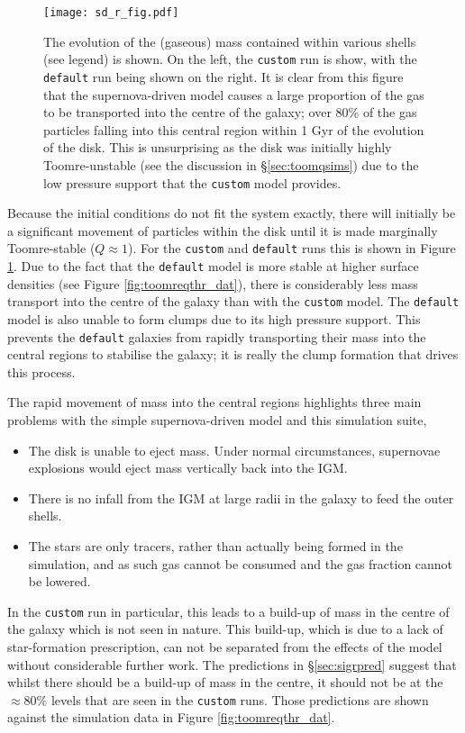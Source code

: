 \begin{figure}[!ht]
    \centering
    \texttt{[image: sd\_r\_fig.pdf]}
    \caption{The evolution of the (gaseous) mass contained within various shells (see legend) is shown. On the left, the {\tt custom} run is show, with the {\tt default} run being shown on the right. It is clear from this figure that the supernova-driven model causes a large proportion of the gas to be transported into the centre of the galaxy; over 80\% of the gas particles falling into this central region within 1 Gyr of the evolution of the disk. This is unsurprising as the disk was initially highly Toomre-unstable (see the discussion in \S \ref{sec:toomqsims}) due to the low pressure support that the {\tt custom} model provides.}
    \label{fig:sd_r_evo}
\end{figure}
Because the initial conditions do not fit the system exactly, there will initially be a significant movement of particles within the disk until it is made marginally Toomre-stable ($Q\approx1$).
For the {\tt custom} and {\tt default} runs this is shown in Figure \ref{fig:sd_r_evo}.
Due to the fact that the {\tt default} model is more stable at higher surface densities (see Figure \ref{fig:toomreqthr_dat}), there is considerably less mass transport into the centre of the galaxy than with the {\tt custom} model.
The {\tt default} model is also unable to form clumps due to its high pressure support.
This prevents the {\tt default} galaxies from rapidly transporting their mass into the central regions to stabilise the galaxy; it is really the clump formation that drives this process. 

The rapid movement of mass into the central regions highlights three main problems with the simple supernova-driven model and this simulation suite,
\begin{itemize}
    \item The disk is unable to eject mass. Under normal circumstances, supernovae explosions would eject mass vertically back into the IGM.
    \item There is no infall from the IGM at large radii in the galaxy to feed the outer shells.
    \item The stars are only tracers, rather than actually being formed in the simulation, and as such gas cannot be consumed and the gas fraction cannot be lowered.
\end{itemize}
In the {\tt custom} run in particular, this leads to a build-up of mass in the centre of the galaxy which is not seen in nature.
This build-up, which is due to a lack of star-formation prescription, can not be separated from the effects of the model without considerable further work.
The predictions in \S \ref{sec:sigrpred} suggest that whilst there should be a build-up of mass in the centre, it should not be at the $\approx 80\%$ levels that are seen in the {\tt custom} runs.
Those predictions are shown against the simulation data in Figure \ref{fig:toomreqthr_dat}.

